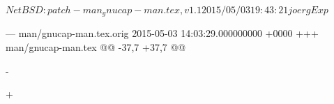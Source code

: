 $NetBSD: patch-man_gnucap-man.tex,v 1.1 2015/05/03 19:43:21 joerg Exp $

--- man/gnucap-man.tex.orig	2015-05-03 14:03:29.000000000 +0000
+++ man/gnucap-man.tex
@@ -37,7 +37,7 @@
 
 \setcounter{tocdepth}{1}
 \makeindex
-\usepackage[dvipdfm]{hyperref}
+\usepackage{hyperref}
 
 
 
